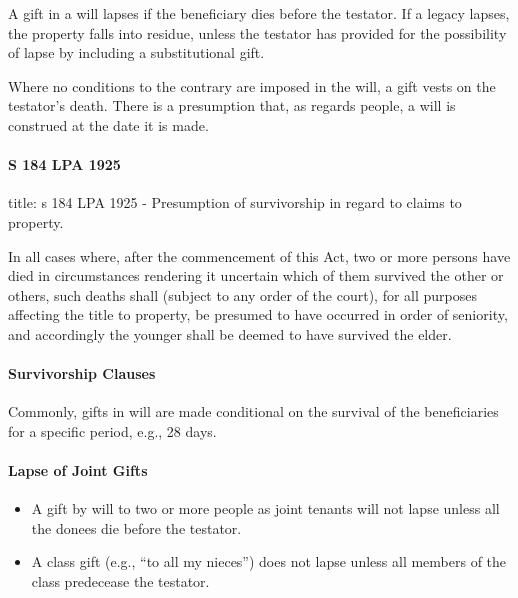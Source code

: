 \documentclass[
]{article}
\newenvironment{Shaded}{}{}
\newcommand{\NormalTok}[1]{#1}
\providecommand{\tightlist}{%
  \setlength{\itemsep}{0pt}\setlength{\parskip}{0pt}}
\begin{document}
A gift in a will lapses if the beneficiary dies before the testator. If
a legacy lapses, the property falls into residue, unless the testator
has provided for the possibility of lapse by including a substitutional
gift.

Where no conditions to the contrary are imposed in the will, a gift
vests on the testator's death. There is a presumption that, as regards
people, a will is construed at the date it is made.

\hypertarget{s-184-lpa-1925}{%
\paragraph{S 184 LPA 1925}\label{s-184-lpa-1925}}

\begin{Shaded}
\begin{Highlighting}[]
\NormalTok{title: s 184 LPA 1925 {-} Presumption of survivorship in regard to claims to property.}

\NormalTok{In all cases where, after the commencement of this Act, two or more persons have died in circumstances rendering it uncertain which of them survived the other or others, such deaths shall (subject to any order of the court), for all purposes affecting the title to property, be presumed to have occurred in order of seniority, and accordingly the younger shall be deemed to have survived the elder. }
\end{Highlighting}
\end{Shaded}

\hypertarget{survivorship-clauses}{%
\paragraph{Survivorship Clauses}\label{survivorship-clauses}}

Commonly, gifts in will are made conditional on the survival of the
beneficiaries for a specific period, e.g., 28 days.

\hypertarget{lapse-of-joint-gifts}{%
\paragraph{Lapse of Joint Gifts}\label{lapse-of-joint-gifts}}

\begin{itemize}
\tightlist
\item
  A gift by will to two or more people as joint tenants will not lapse
  unless all the donees die before the testator.
\item
  A class gift (e.g., ``to all my nieces'') does not lapse unless all
  members of the class predecease the testator.
\end{itemize}
\end{document}
